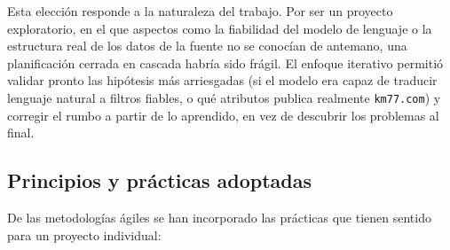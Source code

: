 Esta elección responde a la naturaleza del trabajo. Por ser un proyecto
exploratorio, en el que aspectos como la fiabilidad del modelo de lenguaje o la
estructura real de los datos de la fuente no se conocían de antemano, una
planificación cerrada en cascada habría sido frágil. El enfoque iterativo permitió
validar pronto las hipótesis más arriesgadas (si el modelo era capaz de traducir
lenguaje natural a filtros fiables, o qué atributos publica realmente
\texttt{km77.com}) y corregir el rumbo a partir de lo aprendido, en vez de
descubrir los problemas al final.

\subsection{Principios y prácticas adoptadas}
\label{sec:met-practicas}

De las metodologías ágiles se han incorporado las prácticas que tienen sentido
para un proyecto individual:

